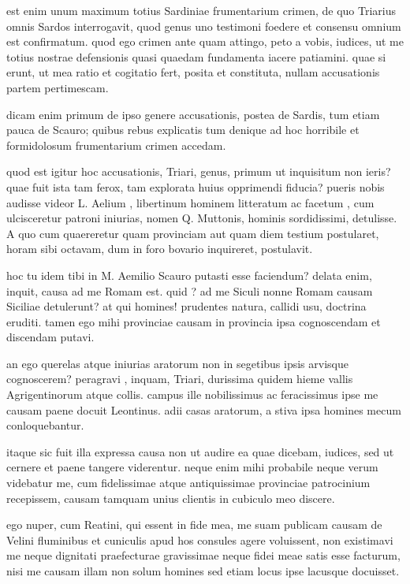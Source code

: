  est enim unum maximum totius Sardiniae frumentarium crimen, de quo Triarius omnis Sardos interrogavit, quod genus uno testimoni foedere et consensu omnium est confirmatum. quod ego crimen ante quam attingo, peto a vobis, iudices, ut me totius nostrae defensionis quasi quaedam fundamenta iacere patiamini. quae si erunt, ut mea ratio et cogitatio fert, posita et constituta, nullam accusationis partem pertimescam.

 dicam enim primum de ipso genere accusationis, postea de Sardis, tum etiam pauca de Scauro; quibus rebus explicatis tum denique ad hoc horribile et formidolosum frumentarium crimen accedam.

 quod est igitur hoc accusationis, Triari, genus, primum ut inquisitum non ieris? quae fuit ista tam ferox, tam explorata huius opprimendi fiducia? pueris nobis audisse videor L. Aelium , libertinum hominem litteratum ac facetum , cum ulcisceretur patroni iniurias, nomen Q. Muttonis, hominis sordidissimi, detulisse. A quo cum quaereretur quam provinciam aut quam diem testium postularet, horam sibi octavam, dum in foro bovario inquireret, postulavit.

 hoc tu idem tibi in M. Aemilio Scauro putasti esse faciendum? delata enim, inquit, causa ad me Romam est. quid ? ad me Siculi nonne Romam causam Siciliae detulerunt? at qui homines! prudentes natura, callidi usu, doctrina eruditi. tamen ego mihi provinciae causam in provincia ipsa cognoscendam et discendam putavi.

 an ego querelas atque iniurias aratorum non in segetibus ipsis arvisque cognoscerem? peragravi , inquam, Triari, durissima quidem hieme vallis Agrigentinorum atque collis. campus ille nobilissimus ac feracissimus ipse me causam paene docuit Leontinus. adii casas aratorum, a stiva ipsa homines mecum conloquebantur.

 itaque sic fuit illa expressa causa non ut audire ea quae dicebam, iudices, sed ut cernere et paene tangere viderentur. neque enim mihi probabile neque verum videbatur me, cum fidelissimae atque antiquissimae provinciae patrocinium recepissem, causam tamquam unius clientis in cubiculo meo discere.

 ego nuper, cum Reatini, qui essent in fide mea, me suam publicam causam de Velini fluminibus et cuniculis apud hos consules agere voluissent, non existimavi me neque dignitati praefecturae gravissimae neque fidei meae satis esse facturum, nisi me causam illam non solum homines sed etiam locus ipse lacusque docuisset.

